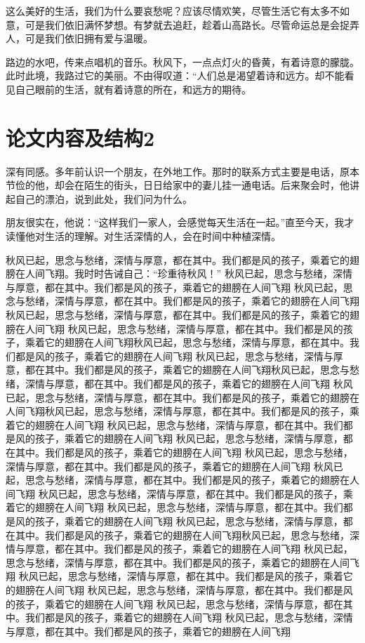 这么美好的生活，我们为什么要哀愁呢？应该尽情欢笑，尽管生活它有太多不如意，可是我们依旧满怀梦想。有梦就去追赶，趁着山高路长。尽管命运总是会捉弄人，可是我们依旧拥有爱与温暖。



路边的水吧，传来点唱机的音乐。秋风下，一点点灯火的昏黄，有着诗意的朦胧。此时此境，我路过它的美丽。不由得叹道：“人们总是渴望着诗和远方。却不能看见自己眼前的生活，就有着诗意的所在，和远方的期待。
\section{论文内容及结构2}
深有同感。多年前认识一个朋友，在外地工作。那时的联系方式主要是电话，原本节俭的他，却会在陌生的街头，日日给家中的妻儿挂一通电话。后来聚会时，他讲起自己的漂泊，说到此处，我们问为什么。



朋友很实在，他说：“这样我们一家人，会感觉每天生活在一起。”直至今天，我才读懂他对生活的理解。对生活深情的人，会在时间中种植深情。



秋风已起，思念与愁绪，深情与厚意，都在其中。我们都是风的孩子，乘着它的翅膀在人间飞翔。我时时告诫自己：“珍重待秋风！”
秋风已起，思念与愁绪，深情与厚意，都在其中。我们都是风的孩子，乘着它的翅膀在人间飞翔
秋风已起，思念与愁绪，深情与厚意，都在其中。我们都是风的孩子，乘着它的翅膀在人间飞翔秋风已起，思念与愁绪，深情与厚意，都在其中。我们都是风的孩子，乘着它的翅膀在人间飞翔
秋风已起，思念与愁绪，深情与厚意，都在其中。我们都是风的孩子，乘着它的翅膀在人间飞翔秋风已起，思念与愁绪，深情与厚意，都在其中。我们都是风的孩子，乘着它的翅膀在人间飞翔
秋风已起，思念与愁绪，深情与厚意，都在其中。我们都是风的孩子，乘着它的翅膀在人间飞翔秋风已起，思念与愁绪，深情与厚意，都在其中。我们都是风的孩子，乘着它的翅膀在人间飞翔
秋风已起，思念与愁绪，深情与厚意，都在其中。我们都是风的孩子，乘着它的翅膀在人间飞翔秋风已起，思念与愁绪，深情与厚意，都在其中。我们都是风的孩子，乘着它的翅膀在人间飞翔
秋风已起，思念与愁绪，深情与厚意，都在其中。我们都是风的孩子，乘着它的翅膀在人间飞翔
秋风已起，思念与愁绪，深情与厚意，都在其中。我们都是风的孩子，乘着它的翅膀在人间飞翔
秋风已起，思念与愁绪，深情与厚意，都在其中。我们都是风的孩子，乘着它的翅膀在人间飞翔
秋风已起，思念与愁绪，深情与厚意，都在其中。我们都是风的孩子，乘着它的翅膀在人间飞翔
秋风已起，思念与愁绪，深情与厚意，都在其中。我们都是风的孩子，乘着它的翅膀在人间飞翔
秋风已起，思念与愁绪，深情与厚意，都在其中。我们都是风的孩子，乘着它的翅膀在人间飞翔
秋风已起，思念与愁绪，深情与厚意，都在其中。我们都是风的孩子，乘着它的翅膀在人间飞翔秋风已起，思念与愁绪，深情与厚意，都在其中。我们都是风的孩子，乘着它的翅膀在人间飞翔
秋风已起，思念与愁绪，深情与厚意，都在其中。我们都是风的孩子，乘着它的翅膀在人间飞翔
秋风已起，思念与愁绪，深情与厚意，都在其中。我们都是风的孩子，乘着它的翅膀在人间飞翔
秋风已起，思念与愁绪，深情与厚意，都在其中。我们都是风的孩子，乘着它的翅膀在人间飞翔
秋风已起，思念与愁绪，深情与厚意，都在其中。我们都是风的孩子，乘着它的翅膀在人间飞翔
秋风已起，思念与愁绪，深情与厚意，都在其中。我们都是风的孩子，乘着它的翅膀在人间飞翔

